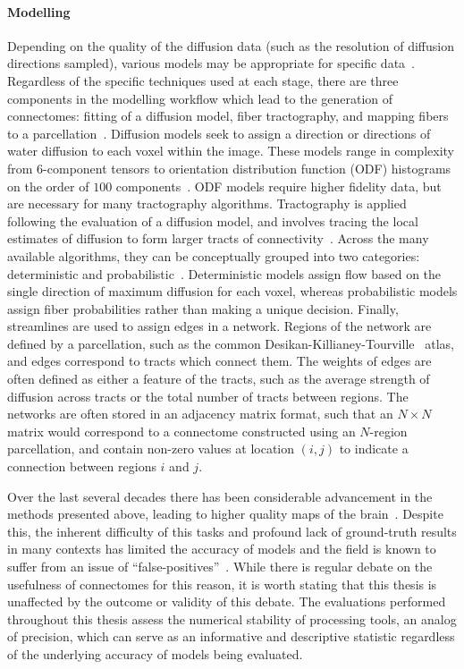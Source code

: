 \paragraph*{Modelling}
Depending on the quality of the diffusion data (such as the resolution of diffusion directions sampled), various models
may be appropriate for specific data~\cite{jeurissen2019diffusion,tournier2011diffusion,mori2013introduction}.
Regardless of the specific techniques used at each stage, there are three components in the modelling workflow which
lead to the generation of connectomes: fitting of a diffusion model, fiber tractography, and mapping fibers to a
parcellation~\cite{roncal2013migraine,sporns2005human,Kiar2018-jt,Glasser2013-vf}. Diffusion models seek to assign a
direction or directions of water diffusion to each voxel within the image. These models range in complexity from
$6$-component tensors to orientation distribution function (ODF) histograms on the order of $100$
components~\cite{tournier2011diffusion}. ODF models require higher fidelity data, but are necessary for many
tractography algorithms. Tractography is applied following the evaluation of a diffusion model, and involves tracing
the local estimates of diffusion to form larger tracts of connectivity~\cite{behrens2014mr}. Across the many available
algorithms, they can be conceptually grouped into two categories: deterministic and
probabilistic~\cite{jeurissen2019diffusion}. Deterministic models assign flow based on the single direction of maximum
diffusion for each voxel, whereas probabilistic models assign fiber probabilities rather than making a unique decision.
Finally, streamlines are used to assign edges in a network. Regions of the network are defined by a parcellation, such
as the common Desikan-Killianey-Tourville~\cite{Klein2012-vi} atlas, and edges correspond to tracts which connect them.
The weights of edges are often defined as either a feature of the tracts, such as the average strength of diffusion
across tracts or the total number of tracts between regions. The networks are often stored in an adjacency matrix
format, such that an $N \times N$ matrix would correspond to a connectome constructed using an $N$-region parcellation,
and contain non-zero values at location $(i,j)$ to indicate a connection between regions $i$ and $j$.

Over the last several decades there has been considerable advancement in the methods presented above, leading to higher
quality maps of the brain~\cite{GIRARD2020117201}. Despite this, the inherent difficulty of this tasks and profound
lack of ground-truth results in many contexts has limited the accuracy of models and the field is known to suffer from
an issue of ``false-positives''~\cite{Thomas16574,sotiropoulos2019building,maier2017challenge}. While there is regular
debate on the usefulness of connectomes for this reason, it is worth stating that this thesis is unaffected by the
outcome or validity of this debate. The evaluations performed throughout this thesis assess the numerical stability of
processing tools, an analog of precision, which can serve as an informative and descriptive statistic regardless of the
underlying accuracy of models being evaluated.

